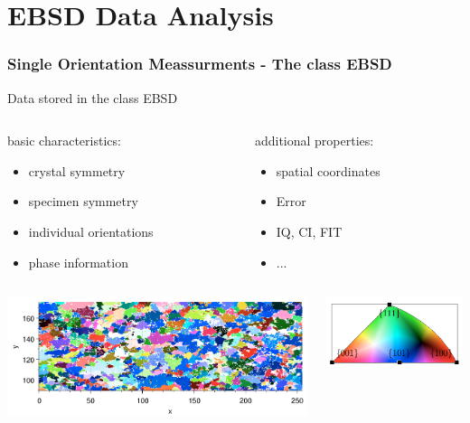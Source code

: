 \section{EBSD Data Analysis}

\begin{frame}[fragile]
  \frametitle{Single Orientation Meassurments - The class EBSD}

  Data stored in the class \alert{EBSD}

  \medskip

  \begin{columns}


    \begin{column}{6cm}

      basic characteristics:
      \begin{itemize}
      \item crystal symmetry
      \item specimen symmetry
      \item individual orientations
      \item phase information
      \end{itemize}

    \end{column}

    \begin{column}{5.5cm}

      additional properties:
      \begin{itemize}
      \item spatial coordinates
      \item Error
      \item IQ, CI, FIT
      \item ...
      \end{itemize}
    \end{column}
  \end{columns}

  \bigskip

  \begin{columns}
    \begin{column}{8cm}
      \includegraphics[height=3.5cm]{pic/ebsd.pdf}
    \end{column}
    \begin{column}{4cm}
      \includegraphics[width=4cm]{pic/ebsdtriangle.pdf}
    \end{column}
  \end{columns}
\end{frame}

